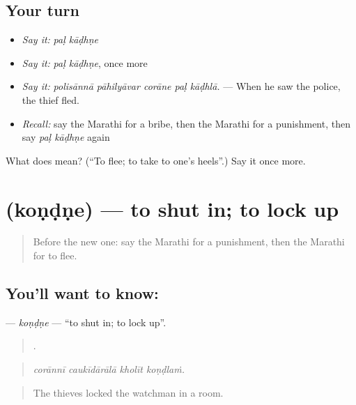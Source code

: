 \subsection*{Your turn}
\begin{itemize}
\raggedright
  \item \emph{Say it:} \emph{paḷ kāḍhṇe}
  \item \emph{Say it:} \emph{paḷ kāḍhṇe}, once more
  \item \emph{Say it:} \emph{polisānnā pāhilyāvar corāne paḷ kāḍhlā.} — When he saw the police, the thief fled.
  \item \emph{Recall:} say the Marathi for a bribe, then the Marathi for a punishment, then say \emph{paḷ kāḍhṇe} again
\end{itemize}

\begin{tcolorbox}[breakable,colback=teal!4,colframe=teal!35!black,title={Before you move on}]
What does   mean? (\textquotedblleft{}To flee; to take to one's heels\textquotedblright{}.) Say it once more.
\end{tcolorbox}
\section[\texorpdfstring{\mr{कोंडणे} (koṇḍṇe)}{कोंडणे (koṇḍṇe)}]{ (koṇḍṇe) — to shut in; to lock up}

\label{lesson:MR-C300-kondne}



\begin{quote}
Before the new one: say the Marathi for a punishment, then the Marathi for to flee.
\end{quote}

\subsection*{You'll want to know: }
\textbf{} — \emph{koṇḍṇe} — \textquotedblleft{}to shut in; to lock up\textquotedblright{}.

\begin{quote}
   .
\end{quote}

\begin{quote}
\emph{corānnī caukīdārālā kholīt koṇḍlaṁ.}
\end{quote}

\begin{quote}
The thieves locked the watchman in a room.
\end{quote}

